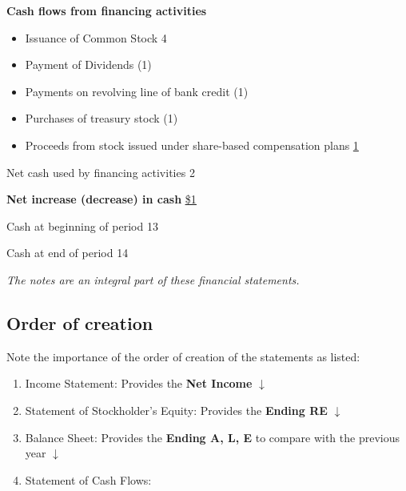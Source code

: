 \begin{tcolorbox}[colframe=black,colback=white,title=Example Statement of Cash Flow]
    \textbf{Cash flows from financing activities}
    \begin{itemize}[label={}, leftmargin=*]
        \item Issuance of Common Stock \hfill 4
        \item Payment of Dividends \hfill (1)
        \item Payments on revolving line of bank credit \hfill (1)
        \item Purchases of treasury stock \hfill (1)
        \item Proceeds from stock issued under share-based compensation plans \hfill \underline{1}
    \end{itemize}
    Net cash used by financing activities \hfill 2

    \textbf{Net increase (decrease) in cash} \hfill \underline{\underline{\$1}}

    Cash at beginning of period \hfill 13

    Cash at end of period \hfill 14

    \vspace{1em}

    \textit{\footnotesize{The notes are an integral part of these financial statements.}}
\end{tcolorbox}

\subsection{Order of creation}

Note the importance of the order of creation of the statements as listed:
\begin{enumerate}
    \item Income Statement: Provides the \textbf{Net Income} $\downarrow$
    \item Statement of Stockholder's Equity: Provides the \textbf{Ending RE} $\downarrow$
    \item Balance Sheet: Provides the \textbf{Ending A, L, E} to compare with the previous year $\downarrow$
    \item Statement of Cash Flows:
\end{enumerate}